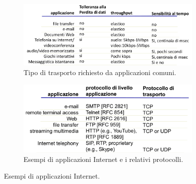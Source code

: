 \documentclass[11pt, italian, openany]{book}
\begin{document}
\begin{sloppypar}
\begin{figure}[h!]
	\begin{subfigure}[t]{0.49 \linewidth} \centering
		\includegraphics[scale=0.18]{images/trasporto-applicazioni-comuni.png}
		\caption{Tipo di trasporto richiesto da applicazioni comuni.}
	\end{subfigure}
	\begin{subfigure}[t]{0.49 \linewidth} \centering
		\includegraphics[scale=0.18]{images/applicazioni-internet.png}
		\caption{Esempi di applicazioni Internet e i relativi protocolli.}
	\end{subfigure}
	\caption{Esempi di applicazioni Internet.}
	\label{fig:applicazioni-internet}
\end{figure}


\end{sloppypar}
\end{document}
